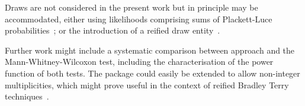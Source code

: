 \documentclass[article]{jss}
\begin{document}
Draws are not considered in the present work but in principle may be
accommodated, either using likelihoods comprising sums of
Plackett-Luce probabilities~\citep{hankin2017}; or the introduction of
a reified draw entity~\citep{hankin2010}.

Further work might include a systematic comparison between
 approach and the Mann-Whitney-Wilcoxon test, including
the characterisation of the power function of both tests.  The package
could easily be extended to allow non-integer multiplicities, which
might prove useful in the context of reified Bradley Terry
techniques~\citep{hankin2020}.


\end{document}
